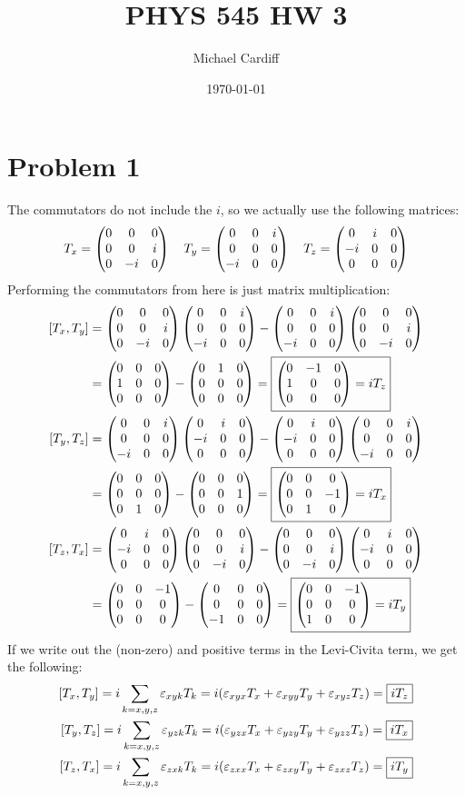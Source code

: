 \documentclass[12pt]{article}
\title{\vspace{-3em}PHYS 545 HW 3}
\author{Michael Cardiff}
\date{\today}
\newcommand{\Tx}{\pmqty{0&0&0\\0&0&i\\0&-i&0}}
\newcommand{\Ty}{\pmqty{0&0&i\\0&0&0\\-i&0&0}}
\newcommand{\Tz}{\pmqty{0&i&0\\-i&0&0\\0&0&0}}
\begin{document}
\section*{Problem 1}
\maketitle
The commutators do not include the $i$, so we actually use the following matrices:
\begin{align*}
  T_x=\pmqty{0&0&0\\0&0&i\\0&-i&0}\quad
  T_y=\pmqty{0&0&i\\0&0&0\\-i&0&0}\quad
  T_z=\pmqty{0&i&0\\-i&0&0\\0&0&0}
\end{align*}
Performing the commutators from here is just matrix multiplication:
\begin{align*}
  \comm{T_x}{T_y}&=\Tx\Ty-\Ty\Tx\\
  &=\pmqty{0&0&0\\1&0&0\\0&0&0}-\pmqty{0&1&0\\0&0&0\\0&0&0}
  =\boxed{\pmqty{0&-1&0\\1&0&0\\0&0&0}=iT_z}\\
  \comm{T_y}{T_z}&=\Ty\Tz-\Tz\Ty\\
  &=\pmqty{0&0&0\\0&0&0\\0&1&0}-\pmqty{0&0&0\\0&0&1\\0&0&0}
  =\boxed{\pmqty{0&0&0\\0&0&-1\\0&1&0}=iT_x}\\
  \comm{T_z}{T_x}&=\Tz\Tx-\Tx\Tz\\
  &=\pmqty{0&0&-1\\0&0&0\\0&0&0}-\pmqty{0&0&0\\0&0&0\\-1&0&0}
  =\boxed{\pmqty{0&0&-1\\0&0&0\\1&0&0}=iT_y}
\end{align*}
If we write out the (non-zero) and positive terms in the Levi-Civita term, we get the following:
\begin{align*}
  \comm{T_x}{T_y}=i\sum_{k=x,y,z}\varepsilon_{xyk}T_k=
  i\qty(\varepsilon_{xyx}T_x+\varepsilon_{xyy}T_y+\varepsilon_{xyz}T_z)
  =\boxed{iT_z}\\
  \comm{T_y}{T_z}=i\sum_{k=x,y,z}\varepsilon_{yzk}T_k=
  i\qty(\varepsilon_{yzx}T_x+\varepsilon_{yzy}T_y+\varepsilon_{yzz}T_z)
  =\boxed{iT_x}\\
  \comm{T_z}{T_x}=i\sum_{k=x,y,z}\varepsilon_{zxk}T_k=
  i\qty(\varepsilon_{zxx}T_x+\varepsilon_{zxy}T_y+\varepsilon_{zxz}T_z)
  =\boxed{iT_y}\\
\end{align*}
\end{document}

